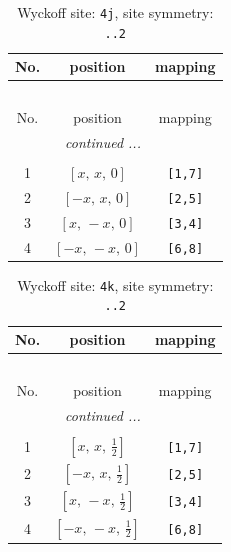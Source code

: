 \documentclass[fleqn,8pt]{jsarticle}
\begin{document}
\begin{longtable}{ccc}
\caption{Wyckoff site: {\tt 4j}, site symmetry: {\tt ..2}}
 \\
 \hline \hline
No. & position & mapping \\ \hline \endfirsthead

\multicolumn{2}{l}{\tablename\ \thetable{}} \\
 \hline \hline
No. & position & mapping \\ \hline \endhead

 \hline \hline
\multicolumn{2}{r}{\footnotesize\it continued ...} \\ \endfoot

 \hline \hline
\multicolumn{2}{r}{} \\ \endlastfoot

1 & $\left[ x,\, x,\, 0 \right]$ & {\tt [1,7]} \\ \hline
2 & $\left[ - x,\, x,\, 0 \right]$ & {\tt [2,5]} \\ \hline
3 & $\left[ x,\, - x,\, 0 \right]$ & {\tt [3,4]} \\ \hline
4 & $\left[ - x,\, - x,\, 0 \right]$ & {\tt [6,8]} \\
\end{longtable}
\renewcommand{\arraystretch}{1.2}
\begin{longtable}{ccc}
\caption{Wyckoff site: {\tt 4k}, site symmetry: {\tt ..2}}
 \\
 \hline \hline
No. & position & mapping \\ \hline \endfirsthead

\multicolumn{2}{l}{\tablename\ \thetable{}} \\
 \hline \hline
No. & position & mapping \\ \hline \endhead

 \hline \hline
\multicolumn{2}{r}{\footnotesize\it continued ...} \\ \endfoot

 \hline \hline
\multicolumn{2}{r}{} \\ \endlastfoot

1 & $\left[ x,\, x,\, \frac{1}{2} \right]$ & {\tt [1,7]} \\ \hline
2 & $\left[ - x,\, x,\, \frac{1}{2} \right]$ & {\tt [2,5]} \\ \hline
3 & $\left[ x,\, - x,\, \frac{1}{2} \right]$ & {\tt [3,4]} \\ \hline
4 & $\left[ - x,\, - x,\, \frac{1}{2} \right]$ & {\tt [6,8]} \\
\end{longtable}
\end{document}
